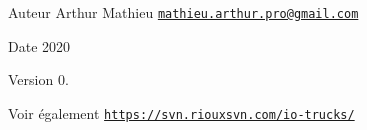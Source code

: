 \begin{DoxyAuthor}{Auteur}
Arthur Mathieu \href{mailto:mathieu.arthur.pro@gmail.com}{\tt mathieu.\+arthur.\+pro@gmail.\+com} 
\end{DoxyAuthor}
\begin{DoxyDate}{Date}
2020 
\end{DoxyDate}
\begin{DoxyVersion}{Version}
0. 
\end{DoxyVersion}
\begin{DoxySeeAlso}{Voir également}
\href{https://svn.riouxsvn.com/io-trucks/}{\tt https\+://svn.\+riouxsvn.\+com/io-\/trucks/} 
\end{DoxySeeAlso}
